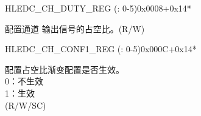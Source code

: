     \begin{register}{H}{LEDC\_CH\_DUTY\_REG (: 0-5)}{0x0008+0x14*}\label{regdesc:LEDCCHNDUTYREG}
    \regnewline%
    \begin{regdesc}\begin{reglist}
    \label{fielddesc:LEDCDUTYCHN}\item [LEDC\_DUTY\_CH\regindex{n}] 配置通道  输出信号的占空比。(R/W)
    \end{reglist}\end{regdesc}
    \end{register}


    \begin{register}{H}{LEDC\_CH\_CONF1\_REG (: 0-5)}{0x000C+0x14*}\label{regdesc:LEDCCHNCONF1REG}
    \regnewline%
    \begin{regdesc}\begin{reglist}
    \label{fielddesc:LEDCDUTYSTARTCHN}\item [LEDC\_DUTY\_START\_CH\regindex{n}] 配置占空比渐变配置是否生效。\\
    0：不生效\\
    1：生效\\
    (R/W/SC)
    \end{reglist}\end{regdesc}
    \end{register}


